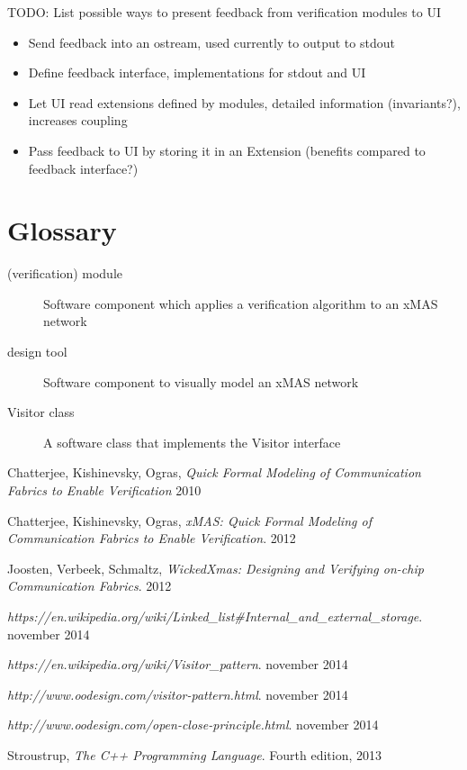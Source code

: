 \documentclass[a4paper,11pt]{article}
\begin{document}
TODO: List possible ways to present feedback from verification modules to UI

\begin{itemize}
 \item Send feedback into an ostream, used currently to output to stdout
 \item Define feedback interface, implementations for stdout and UI
 \item Let UI read extensions defined by modules, detailed information (invariants?), increases coupling
 \item Pass feedback to UI by storing it in an Extension (benefits compared to feedback interface?)
\end{itemize}






\section{Glossary}
\begin{description}
 \item[(verification) module] 	Software component which applies a verification algorithm to an xMAS network
 \item[design tool]		Software component to visually model an xMAS network
 \item[Visitor class]		A software class that implements the Visitor interface
\end{description}

\begin{thebibliography}{9}

  Chatterjee, Kishinevsky, Ogras,
  \emph{Quick Formal Modeling of Communication Fabrics to Enable Verification}
  2010
  
  Chatterjee, Kishinevsky, Ogras,
  \emph{xMAS: Quick Formal Modeling of Communication Fabrics to Enable Verification}.
  2012
  
  Joosten, Verbeek, Schmaltz,
  \emph{WickedXmas: Designing and Verifying on-chip Communication Fabrics}.
  2012
  
  
  \emph{https://en.wikipedia.org/wiki/Linked\_list\#Internal\_and\_external\_storage}.
  november 2014
  
  \emph{https://en.wikipedia.org/wiki/Visitor\_pattern}.
  november 2014

  \emph{http://www.oodesign.com/visitor-pattern.html}.
  november 2014
  
  \emph{http://www.oodesign.com/open-close-principle.html}.
  november 2014
  
  Stroustrup,
  \emph{The C++ Programming Language}.
  Fourth edition,
  2013
  
  
  
\end{thebibliography}
\end{document}
